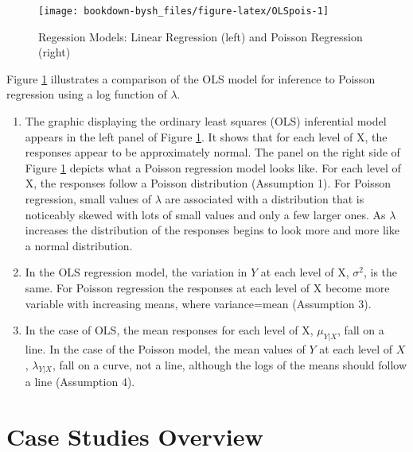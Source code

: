 \documentclass[
]{krantz}
\providecommand{\tightlist}{%
  \setlength{\itemsep}{0pt}\setlength{\parskip}{0pt}}
\begin{document}
\begin{figure}

{\centering \texttt{[image: bookdown-bysh\_files/figure-latex/OLSpois-1]} 

}

\caption{Regession Models: Linear Regression (left) and Poisson Regression (right)}\label{fig:OLSpois}
\end{figure}

Figure \ref{fig:OLSpois} illustrates a comparison of the OLS model for inference to Poisson regression using a log function of \(\lambda\).

\begin{enumerate}
\def\labelenumi{\arabic{enumi}.}
\tightlist
\item
  The graphic displaying the ordinary least squares (OLS) inferential model appears in the left panel of Figure \ref{fig:OLSpois}. It shows that for each level of X, the responses appear to be approximately normal. The panel on the right side of Figure \ref{fig:OLSpois} depicts what a Poisson regression model looks like. For each level of X, the responses follow a Poisson distribution (Assumption 1). For Poisson regression, small values of \(\lambda\) are associated with a distribution that is noticeably skewed with lots of small values and only a few larger ones. As \(\lambda\) increases the distribution of the responses begins to look more and more like a normal distribution.
\item
  In the OLS regression model, the variation in \(Y\) at each level of X, \(\sigma^2\), is the same. For Poisson regression the responses at each level of X become more variable with increasing means, where variance=mean (Assumption 3).
\item
  In the case of OLS, the mean responses for each level of X, \(\mu_{Y|X}\), fall on a line. In the case of the Poisson model, the mean values of \(Y\) at each level of \(X\), \(\lambda_{Y|X}\), fall on a curve, not a line, although the logs of the means should follow a line (Assumption 4).
\end{enumerate}

\hypertarget{case-studies-overview}{%
\section{Case Studies Overview}\label{case-studies-overview}}
\end{document}
